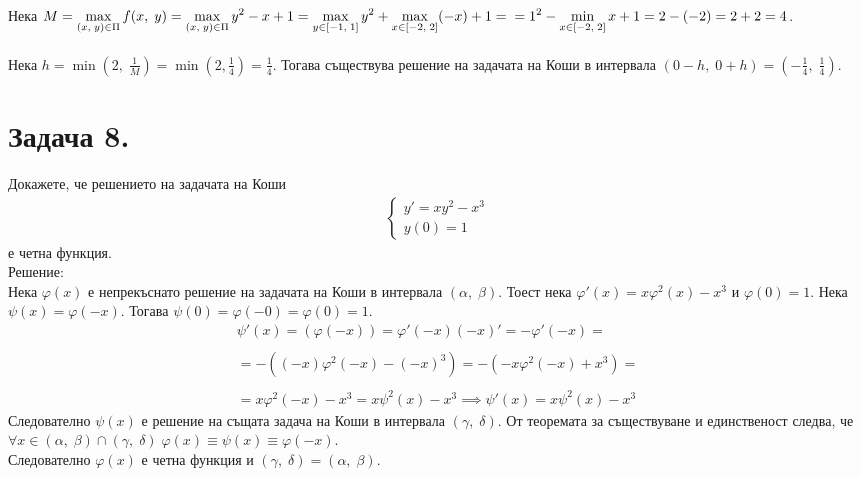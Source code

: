 \documentclass[a4paper, 12pt, oneside]{article}
\begin{document}
Нека $M = \displaystyle\max_{(x, \; y) \in \Pi} f(x, \; y) = \displaystyle\max_{(x, \; y) \in \Pi} y^2 -x + 1
    = \displaystyle\max_{y \in [-1, \; 1]} y^2 + \displaystyle\max_{x \in [-2, \; 2]} (-x) + 1 = \\\\
    = 1^2 -\displaystyle\min_{x \in [-2, \; 2]} x + 1 = 2 -(-2) = 2 + 2 = 4 $. \\\\
Нека $h = \min(2, \; \frac{1}{M}) = \min(2, \frac{1}{4}) = \frac{1}{4}$.
Тогава съществува решение на задачата на Коши в интервала $(0 - h, \; 0 + h) = \left(-\frac{1}{4}, \; \frac{1}{4}\right)$.

\section{Задача 8.}
Докажете, че решението на задачата на Коши
\begin{align*}
    \begin{cases}
        y' = xy^2 - x^3 \\
        y(0) = 1
    \end{cases}
\end{align*}
е четна функция. \\

Решение: \\

Нека $\varphi(x)$ е непрекъснато решение на задачата на Коши в интервала $(\alpha, \; \beta)$.
Тоест нека $\varphi'(x) = x\varphi^2(x) - x^3$ и $\varphi(0) = 1$.
Нека $\psi(x) = \varphi(-x)$. Тогава $\psi(0) = \varphi(-0) = \varphi(0) = 1$.
\begin{align*}
    \psi'(x) = (\varphi(-x)) = \varphi'(-x)(-x)' = -\varphi'(-x) = \\\\
    = -((-x)\varphi^2(-x) - (-x)^3) = -(-x\varphi^2(-x) + x^3) = \\\\
    = x\varphi^2(-x) - x^3 = x\psi^2(x) - x^3 \implies \psi'(x) = x\psi^2(x) - x^3
\end{align*}
Следователно $\psi(x)$ е решение на същата задача на Коши в интервала $(\gamma, \; \delta)$.
От теоремата за съществуване и единственост следва, че \\

$\forall x \in (\alpha, \; \beta) \cap (\gamma, \; \delta) \; \varphi(x) \equiv \psi(x) \equiv \varphi(-x)$. \\

Следователно $\varphi(x)$ е четна функция и $(\gamma, \; \delta) = (\alpha, \; \beta)$.
\end{document}

